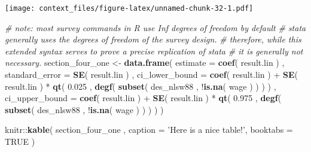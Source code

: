 \documentclass[]{book}
\newenvironment{Shaded}{\begin{snugshade}}{\end{snugshade}}
\newcommand{\KeywordTok}[1]{\textcolor[rgb]{0.13,0.29,0.53}{\textbf{{#1}}}}
\newcommand{\DataTypeTok}[1]{\textcolor[rgb]{0.13,0.29,0.53}{{#1}}}
\newcommand{\FloatTok}[1]{\textcolor[rgb]{0.00,0.00,0.81}{{#1}}}
\newcommand{\StringTok}[1]{\textcolor[rgb]{0.31,0.60,0.02}{{#1}}}
\newcommand{\CommentTok}[1]{\textcolor[rgb]{0.56,0.35,0.01}{\textit{{#1}}}}
\newcommand{\OtherTok}[1]{\textcolor[rgb]{0.56,0.35,0.01}{{#1}}}
\newcommand{\NormalTok}[1]{{#1}}
\theoremstyle{definition}
\theoremstyle{definition}
\theoremstyle{remark}
\begin{document}
\texttt{[image: context\_files/figure-latex/unnamed-chunk-32-1.pdf]}

\begin{Shaded}
\begin{Highlighting}[]
\CommentTok{# note: most survey commands in R use Inf degrees of freedom by default}
\CommentTok{# stata generally uses the degrees of freedom of the survey design.}
\CommentTok{# therefore, while this extended syntax serves to prove a precise replication of stata}
\CommentTok{# it is generally not necessary.}
\NormalTok{section_four_one <-}
\StringTok{    }\KeywordTok{data.frame}\NormalTok{( }
        \DataTypeTok{estimate =} \KeywordTok{coef}\NormalTok{( result.lin ) , }
        \DataTypeTok{standard_error =} \KeywordTok{SE}\NormalTok{( result.lin ) , }
        \DataTypeTok{ci_lower_bound =} 
            \KeywordTok{coef}\NormalTok{( result.lin ) +}\StringTok{ }
\StringTok{            }\KeywordTok{SE}\NormalTok{( result.lin ) *}\StringTok{ }
\StringTok{            }\KeywordTok{qt}\NormalTok{( }\FloatTok{0.025} \NormalTok{, }\KeywordTok{degf}\NormalTok{( }\KeywordTok{subset}\NormalTok{( des_nlsw88 , !}\KeywordTok{is.na}\NormalTok{( wage ) ) ) ) ,}
        \DataTypeTok{ci_upper_bound =} 
            \KeywordTok{coef}\NormalTok{( result.lin ) +}\StringTok{ }
\StringTok{            }\KeywordTok{SE}\NormalTok{( result.lin ) *}\StringTok{ }
\StringTok{            }\KeywordTok{qt}\NormalTok{( }\FloatTok{0.975} \NormalTok{, }\KeywordTok{degf}\NormalTok{( }\KeywordTok{subset}\NormalTok{( des_nlsw88 , !}\KeywordTok{is.na}\NormalTok{( wage ) ) ) )}
    \NormalTok{)}
    

\NormalTok{knitr::}\KeywordTok{kable}\NormalTok{(}
  \NormalTok{section_four_one , }\DataTypeTok{caption =} \StringTok{'Here is a nice table!'}\NormalTok{,}
  \DataTypeTok{booktabs =} \OtherTok{TRUE}
\NormalTok{)}
\end{Highlighting}
\end{Shaded}
\end{document}
